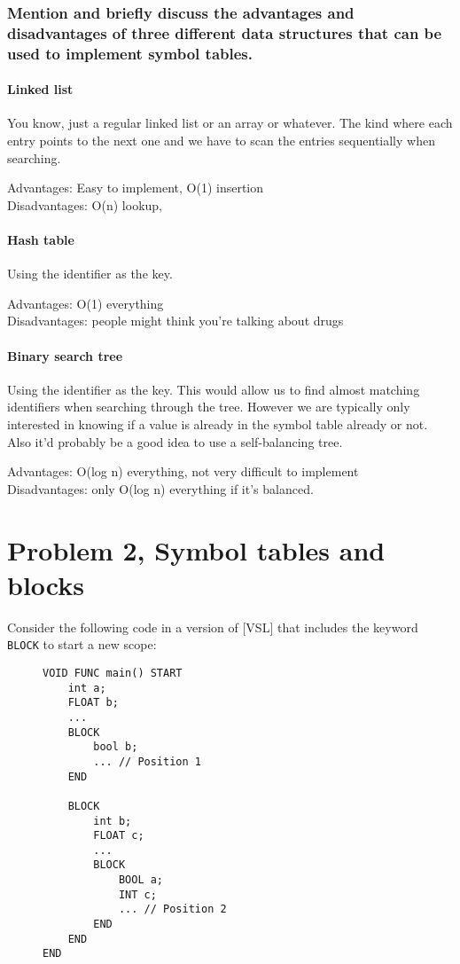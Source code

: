 \subsubsection{Mention and briefly discuss the advantages and disadvantages of three different data structures that can be used to implement symbol tables.}
\paragraph{Linked list}

You know, just a regular linked list or an array or whatever.
The kind where each entry points to the next one and we have to scan the entries sequentially when searching.

Advantages: Easy to implement, O(1) insertion\\
Disadvantages: O(n) lookup, 


\paragraph{Hash table}

Using the identifier as the key.

Advantages: O(1) everything\\
Disadvantages: people might think you're talking about drugs

\paragraph{Binary search tree}

Using the identifier as the key.
This would allow us to find almost matching identifiers when searching through the tree.
However we are typically only interested in knowing if a value is already in the symbol table already or not.
Also it'd probably be a good idea to use a self-balancing tree.

Advantages: O(log n) everything, not very difficult to implement\\
Disadvantages: only O(log n) everything if it's balanced.

\newpage
\setcounter{subsubsection}{0}
\section{Problem 2, Symbol tables and blocks}
Consider the following code in a version of [VSL] that includes the keyword \texttt{BLOCK} to start a new scope:
\begin{figure}[H]
\begin{verbatim}
VOID FUNC main() START
    int a;
    FLOAT b;
    ...
    BLOCK
        bool b;
        ... // Position 1
    END

    BLOCK
        int b;
        FLOAT c;
        ...
        BLOCK
            BOOL a;
            INT c;
            ... // Position 2
        END
    END
END
\end{verbatim}
\end{figure}


